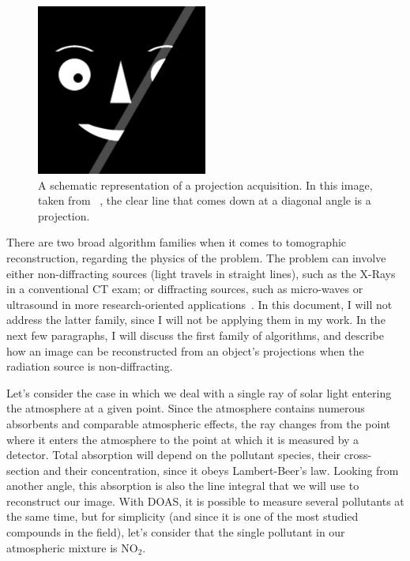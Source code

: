 \begin{figure}[htpb]
    \centering
    \includegraphics[width=0.5\textwidth]{img/projections.png}
    \caption{A schematic representation of a projection acquisition. In
    this image, taken from ~\cite{Herman2009}, the clear line that comes
    down at a diagonal angle is a projection.}
    \label{fig:projection}
\end{figure}

There are two broad algorithm families when it comes to tomographic
reconstruction, regarding the physics of the problem. The problem can
involve either non-diffracting sources (light travels in straight
lines), such as the X-Rays in a conventional \gls{CT} exam; or
diffracting sources, such as micro-waves or ultrasound in more
research-oriented applications~\cite{Kak2001}. In this document, I will
not address the latter family, since I will not be applying them in my
work. In the next few paragraphs, I will discuss the first family of
algorithms, and describe how an image can be reconstructed from an
object's projections when the radiation source is non-diffracting.

Let's consider the case in which we deal with a single ray of solar
light entering the atmosphere at a given point. Since the atmosphere
contains numerous absorbents and comparable atmospheric effects, the ray
changes from the point where it enters the atmosphere to the point at
which it is measured by a detector. Total absorption will depend on the
pollutant species, their cross-section and their concentration, since it
obeys Lambert-Beer's law. Looking from another angle, this absorption
is also the line integral that we will use to reconstruct our image.
With \gls{DOAS}, it is possible to measure several pollutants at the
same time, but for simplicity (and since it is one of the most studied
compounds in the field), let's consider that the single pollutant in our
atmospheric mixture is NO$_2$.

